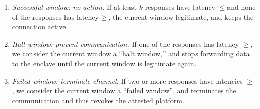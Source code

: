 \begin{enumerate}
  \item \emph{Successful window: no action.} If at least $k$ responses have latency $\leq$\connect and none of the responses has latency$\geq$\detach, the current window legitimate, and \device keeps the connection active.
 
  \item \emph{Halt window: prevent communication.} If one of the responses has latency $\geq$\detach, we consider the current window a ``halt window,'' and \device stops forwarding data to the enclave until the current window is legitimate again.

  \item \emph{Failed window: terminate channel.} If two or more responses have latencies $\geq$\detach, we consider the current window a ``failed window'', and \device terminates the communication and thus revokes the attested platform.
\end{enumerate}
